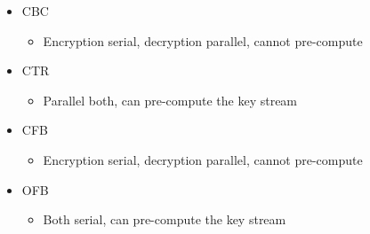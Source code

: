 \documentclass[11pt]{article}
\begin{document}
\begin{enumerate}
\begin{itemize}
\item CBC
\begin{itemize}
\item Encryption serial, decryption parallel, cannot pre-compute
\end{itemize}
\item CTR
\begin{itemize}
\item Parallel both, can pre-compute the key stream
\end{itemize}
\item CFB
\begin{itemize}
\item Encryption serial, decryption parallel, cannot pre-compute
\end{itemize}
\item OFB
\begin{itemize}
\item Both serial, can pre-compute the key stream
\end{itemize}
\end{itemize}
\end{enumerate}
\end{document}
